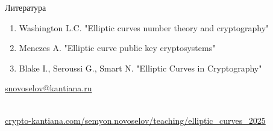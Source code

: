 \documentclass{beamer}
\begin{document}
	\begin{frame}{Литература}
		\nocite{Menezes1993}\nocite{Blake1999}\nocite{Washington2008}
		
		\begin{enumerate}
			\item[\structure{\faBook}] Washington L.C. "Elliptic curves number theory and cryptography"%
			\vspace{0.5em}
			
			\item[\structure{\faBook}] Menezes A. "Elliptic curve public key cryptosystems"
			\vspace{0.5em}
			
			\item[\structure{\faBook}] Blake I., Seroussi G., Smart N. "Elliptic Curves in Cryptography"
		\end{enumerate}
		
		\begin{center}
			\begin{tcolorbox}[enhanced,hbox,colback=block-green-color-bg,colframe=subsection-color!120,title=Контакты,center title]
				\begin{varwidth}{\textwidth}
					\begin{center}
						\href{mailto:snovoselov@kantiana.ru}{snovoselov@kantiana.ru}
					\end{center}
				\end{varwidth}
			\end{tcolorbox}	
		\end{center}
		
		\\
		{\footnotesize
			\href{https://crypto-kantiana.com/semyon.novoselov/teaching/elliptic_curves_2025}{crypto-kantiana.com/semyon.novoselov/teaching/elliptic\_curves\_2025}
		}
		
	\end{frame}
	
\end{document}
